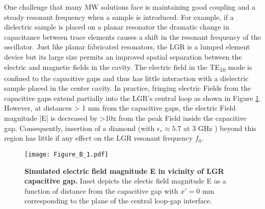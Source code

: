 One challenge that many MW solutions face is maintaining good coupling and a steady resonant frequency when a sample is introduced. For example, if a dielectric sample is placed on a planar resonator the dramatic change in capacitance between trace elements causes a shift in the resonant frequency \cite{bayat2014efficient, sasaki2016broadband, zhang2016microwave} of the oscillator. Just like planar fabricated resonators, the LGR is a lumped element device but its large size permits an improved spatial separation between the electric and magnetic fields in the cavity. The electric field in the TE\textsubscript{10} mode is confined to the capacitive gaps and thus has little interaction with a dielectric sample placed in the center cavity. In practice, fringing electric Fields from the capacitive gaps extend partially into the LGR's central loop as shown in Figure \ref{LGR_Electric}. However, at distances > 1 mm from the capacitive gaps, the electric Field magnitude |E| is decreased by >10x from the peak Field inside the capacitive gap. Consequently, insertion of a diamond (with
$\epsilon_r \approx 5.7$ at 3 GHz \cite{ibarra1997wide}) beyond this region has little if any effect on the LGR resonant frequency $f_0$.

\begin{figure}[t!]
\centering
\texttt{[image: Figure\_B\_1.pdf]}  
\caption{\textbf{Simulated electric field magnitude E in vicinity of LGR capacitive gap.} Inset depicts the electic field
magnitude E as a function of distance from the capacitive gap with $x' = 0$ mm corresponding to the plane of the central loop-gap interface.}
\label{LGR_Electric}
\end{figure}


